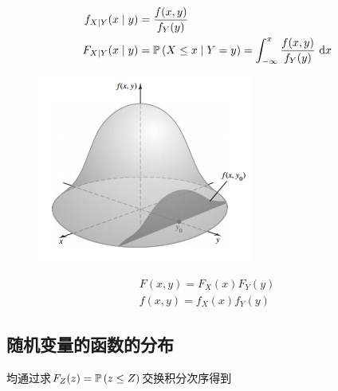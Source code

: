 \begin{definition}[条件概率密度与分布函数]
\[\begin{aligned}
f_{X\mid Y}(x\mid y)&=\dfrac{f(x,y)}{f_Y(y)}\\
F_{X\mid Y}(x\mid y)&=\mathbb{P}\left(X\leq x\mid Y=y\right)=\displaystyle\int_{-\infty}^{x}{\dfrac{f(x,y)}{f_Y(y)}}\,\,\mathrm{d} x
\end{aligned}\]
\end{definition}
\begin{figure}[H]
\centering
\includegraphics[width=0.4\linewidth]{fig/conditional_distribution.PNG}
\end{figure}
\begin{definition}[相互独立]
\[\begin{aligned}
F(x,y)=F_X(x)F_Y(y)\\
f(x,y)=f_X(x)f_Y(y)
\end{aligned}\]
\end{definition}

\subsection{随机变量的函数的分布}
均通过求$F_Z(z)=\mathbb{P}\left(z\leq Z\right)$交换积分次序得到
